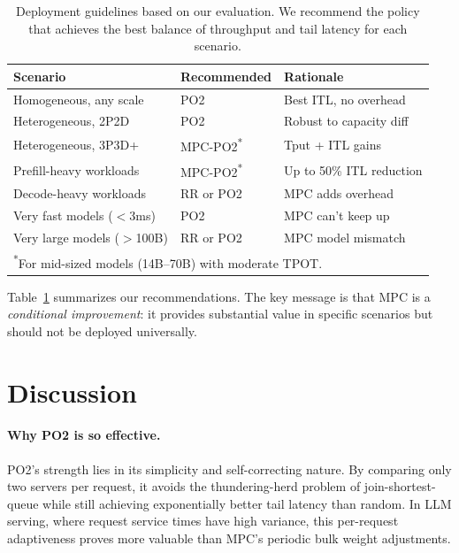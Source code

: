 \documentclass[runningheads]{llncs}
\begin{document}
\begin{table}[t]
\caption{Deployment guidelines based on our evaluation. We recommend the policy that achieves the best balance of throughput and tail latency for each scenario.}
\label{tab:guidelines}
\centering
\small
\begin{tabular}{l l l}
\toprule
\textbf{Scenario} & \textbf{Recommended} & \textbf{Rationale} \\
\midrule
Homogeneous, any scale & PO2 & Best ITL, no overhead \\
Heterogeneous, 2P2D & PO2 & Robust to capacity diff \\
Heterogeneous, 3P3D+ & MPC-PO2\textsuperscript{*} & Tput + ITL gains \\
Prefill-heavy workloads & MPC-PO2\textsuperscript{*} & Up to 50\% ITL reduction \\
Decode-heavy workloads & RR or PO2 & MPC adds overhead \\
Very fast models ($<$3ms) & PO2 & MPC can't keep up \\
Very large models ($>$100B) & RR or PO2 & MPC model mismatch \\
\bottomrule
\multicolumn{3}{l}{\textsuperscript{*}\footnotesize For mid-sized models (14B--70B) with moderate TPOT.}
\end{tabular}
\end{table}

Table~\ref{tab:guidelines} summarizes our recommendations. The key message is that MPC is a \textit{conditional improvement}: it provides substantial value in specific scenarios but should not be deployed universally.

\section{Discussion}
\label{sec:discussion}

\paragraph{Why PO2 is so effective.} PO2's strength lies in its simplicity and self-correcting nature. By comparing only two servers per request, it avoids the thundering-herd problem of join-shortest-queue while still achieving exponentially better tail latency than random. In LLM serving, where request service times have high variance, this per-request adaptiveness proves more valuable than MPC's periodic bulk weight adjustments.
\end{document}
